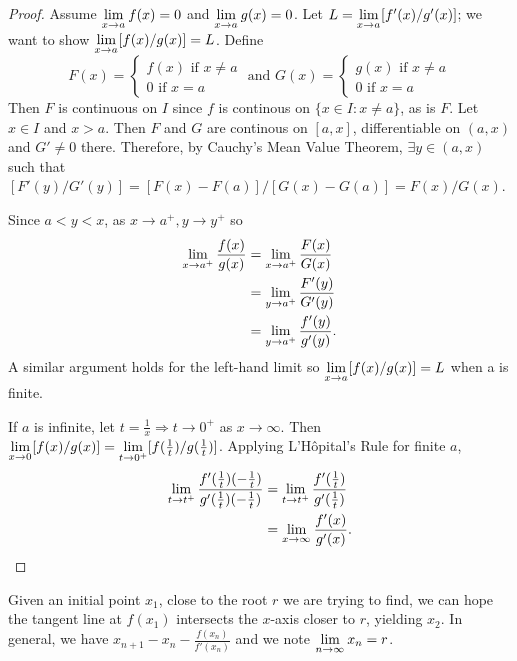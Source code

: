 \documentclass[a4paper,8pt]{article}
\begin{document}
\begin{outline}
    \begin{proof}
      Assume \(\xlimit{x}{a}f(x) = 0\) and \(\xlimit{x}{a}g(x) = 0\). Let \(L = \xlimit{x}{a}[f'(x)/g'(x)]\);
      we want to show \(\xlimit{x}{a}[f(x)/g(x)] = L\). Define
      \[ F(x) =
        \begin{cases}
          f(x) \text{ if } x \neq a\\
          0 \text{ if } x = a
        \end{cases}\text{ and }
        G(x) =
        \begin{cases}
          g(x) \text{ if } x \neq a\\
          0 \text{ if } x = a
        \end{cases}
      \]
      Then \(F\) is continuous on \(I\) since \(f\) is continous on \(\{x \in I : x \neq a\}\), as is \(F\).
      Let \(x \in I\) and \(x > a\). Then \(F\) and \(G\) are continous on \([a, x]\), differentiable on \((a, x)\)
      and \(G' \neq 0\) there. Therefore, by Cauchy's Mean Value Theorem, \(\exists y \in (a, x)\) such that
      \([F'(y)/G'(y)] = [F(x)-F(a)]/[G(x)-G(a)] = F(x)/G(x)\).

      Since \(a < y < x\), as \(x\rightarrow a^{+}, y\rightarrow y^{+}\) so
      \begin{align*}
        \xlimit[+]{x}{a}\frac{f(x)}{g(x)}
          &= \xlimit[+]{x}{a}\frac{F(x)}{G(x)}\\
          &= \xlimit[+]{y}{a}\frac{F'(y)}{G'(y)}\\
          &= \xlimit[+]{y}{a}\frac{f'(y)}{g'(y)}\text{.}
      \end{align*}
      A similar argument holds for the left-hand limit so \(\xlimit{x}{a}[f(x)/g(x)] = L\) when a is finite.

      If \(a\) is infinite, let \(t = \frac{1}{x} \Rightarrow t\rightarrow 0^{+}\) as \(x\rightarrow \infty\).
      Then \(\xlimit{x}{0}[f(x)/g(x)] = \xlimit[+]{t}{0}[f(\frac{1}{t})/g(\frac{1}{t})]\).
      Applying L'H\^{o}pital's Rule for finite \(a\),
      \begin{align*}
        \xlimit[+]{t}{t}\frac{f'(\frac{1}{t})(-\frac{1}{t})}{g'(\frac{1}{t})(-\frac{1}{t})}
          &= \xlimit[+]{t}{t}\frac{f'(\frac{1}{t})}{g'(\frac{1}{t})}\\
          &= \xlimit{x}{\infty}\frac{f'(x)}{g'(x)}\text{.}
      \end{align*}
    \end{proof}

    Given an initial point \(x_1\), close to the root \(r\) we are trying to find, we can hope the tangent line
    at \(f(x_1)\) intersects the \(x\)-axis closer to \(r\), yielding \(x_2\). In general, we have \(x_{n+1} -
    x_n - \frac{f(x_n)}{f'(x_n)}\) and we note \(\xlimit{n}{\infty}x_n = r\).


\end{outline}
\end{document}
